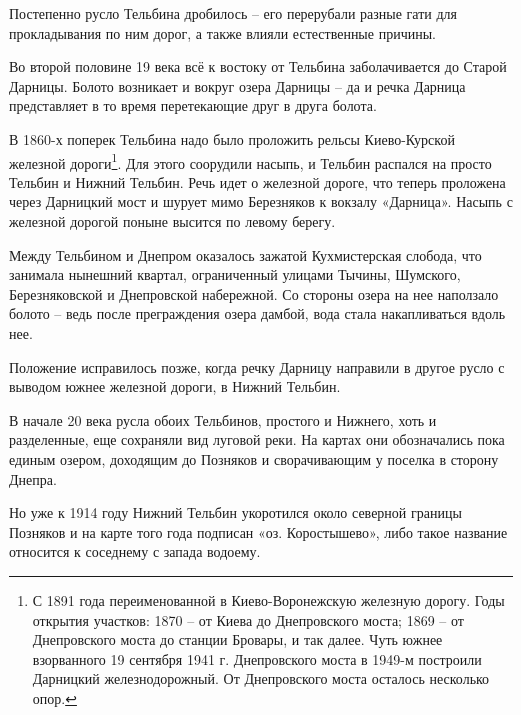Постепенно русло Тельбина дробилось – его перерубали разные гати для прокладывания по ним дорог, а также влияли естественные причины.

Во второй половине 19 века всё к востоку от Тельбина заболачивается до Старой Дарницы.
Болото возникает и вокруг озера Дарницы – да и речка Дарница представляет в то время перетекающие друг в друга болота.

В 1860-х поперек Тельбина надо было проложить рельсы Киево-Курской железной дороги\footnote{С 1891 года переименованной в Киево-Воронежскую железную дорогу. Годы открытия участков: 1870 – от Киева до Днепровского моста; 1869 – от Днепровского моста до станции Бровары, и так далее. Чуть южнее взорванного 19 сентября 1941 г. Днепровского моста в 1949-м построили Дарницкий железнодорожный. От Днепровского моста осталось несколько опор.}. Для этого соорудили насыпь, и Тельбин распался на просто Тельбин и Нижний Тельбин. Речь идет о железной дороге, что теперь проложена через Дарницкий мост и шурует мимо Березняков к вокзалу «Дарница». Насыпь с железной дорогой поныне высится по левому берегу.

Между Тельбином и Днепром оказалось зажатой Кухмистерская слобода, что занимала нынешний квартал, ограниченный улицами Тычины, Шумского, Березняковской и Днепровской набережной. Со стороны озера на нее наползало болото – ведь после преграждения озера дамбой, вода стала накапливаться вдоль нее.

Положение исправилось позже, когда речку Дарницу направили в другое русло с выводом южнее железной дороги, в Нижний Тельбин. 


В начале 20 века русла обоих Тельбинов, простого и Нижнего, хоть и разделенные, еще сохраняли вид луговой реки. На картах они обозначались пока единым озером, доходящим до Позняков и сворачивающим у поселка в сторону Днепра. 

Но уже к 1914 году Нижний Тельбин укоротился около северной границы Позняков и на карте того года подписан «оз. Коростышево», либо такое название относится к соседнему с запада водоему. 

